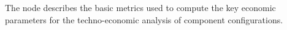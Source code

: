 The  node describes the basic metrics used to compute the key economic parameters for the techno-economic analysis of component configurations.
